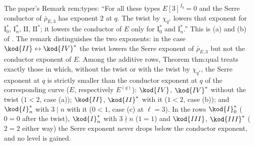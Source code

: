 \begin{paperlink}
The paper's Remark rem:types: ``For all these types $E[3]^{I_q}=0$ and the Serre conductor of $\bar\rho_{E,3}$ has exponent $2$ at $q$. The
twist by $\chi_{q^*}$ lowers that exponent for $\mathrm{I}_0^*$, $\mathrm{I}_n^*$, $\mathrm{II}$, $\mathrm{II}^*$; it lowers the conductor of $E$
only for $\mathrm{I}_0^*$ and $\mathrm{I}_n^*$.'' This is (a) and (b) of . The remark distinguishes the two exponents: in the case
$\kod{II}\leftrightarrow\kod{IV}^*$ the twist lowers the Serre exponent of $\bar\rho_{E,3}$ but not the conductor exponent of $E$. Among the additive rows, Theorem thm:qual treats exactly those in
which, without the twist or with the twist by $\chi_{q^*}$, the Serre exponent at $q$ is strictly smaller than the conductor exponent at $q$ of the
corresponding curve ($E$, respectively $E^{(q)}$): $\kod{IV}$, $\kod{IV}^*$ without the twist ($1<2$, case (a)); $\kod{II}$, $\kod{II}^*$ with it ($1<2$, case
(b)); and $\kod{I}_n^*$ with $3\mid n$ with it ($0<1$, case (c) at $\ell=3$). In the rows $\kod{I}_0^*$ ($0=0$ after the twist), $\kod{I}_n^*$ with $3\nmid n$ ($1=1$)
and $\kod{III}$, $\kod{III}^*$ ($2=2$ either way) the Serre exponent never drops below the conductor exponent, and no level is gained.
\end{paperlink}

